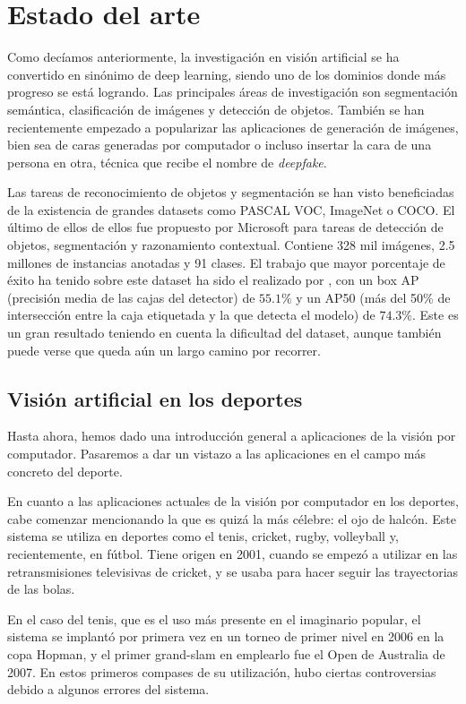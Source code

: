 \section{Estado del arte}

Como decíamos anteriormente, la investigación en visión artificial se ha convertido en sinónimo de deep learning, siendo uno de los dominios donde más progreso se está logrando. Las principales áreas de investigación son segmentación semántica, clasificación de imágenes y detección de objetos. También se han recientemente empezado a popularizar las aplicaciones de generación de imágenes, bien sea de caras generadas por computador o incluso insertar la cara de una persona en otra, técnica que recibe el nombre de \textit{deepfake}.

Las tareas de reconocimiento de objetos y segmentación se han visto beneficiadas de la existencia de grandes datasets como PASCAL VOC, ImageNet o COCO. El último de ellos de ellos fue propuesto por Microsoft para tareas de detección de objetos, segmentación y razonamiento contextual. Contiene 328 mil imágenes, 2.5 millones de instancias anotadas y 91 clases. El trabajo que mayor porcentaje de éxito ha tenido sobre este dataset ha sido el realizado por \citet{art:tan2019efficientdet}, con un box AP (precisión media de las cajas del detector) de $55.1\%$ y un AP50 (más del 50\% de intersección entre la caja etiquetada y la que detecta el modelo) de $74.3\%$. Este es un gran resultado teniendo en cuenta la dificultad del dataset, aunque también puede verse que queda aún un largo camino por recorrer.

\subsection{Visión artificial en los deportes}
Hasta ahora, hemos dado una introducción general a aplicaciones de la visión por computador. Pasaremos a dar un vistazo a las aplicaciones en el campo más concreto del deporte.

En cuanto a las aplicaciones actuales de la visión por computador en los deportes, cabe comenzar mencionando la que es quizá la más célebre: el ojo de halcón. Este sistema se utiliza en deportes como el tenis, cricket, rugby, volleyball y, recientemente, en fútbol. Tiene origen en 2001, cuando se empezó a utilizar en las retransmisiones televisivas de cricket, y se usaba para hacer seguir las trayectorias de las bolas.

En el caso del tenis, que es el uso más presente en el imaginario popular, el sistema se implantó por primera vez en un torneo de primer nivel en 2006 en la copa Hopman, y el primer grand-slam en emplearlo fue el Open de Australia de 2007. En estos primeros compases de su utilización, hubo ciertas controversias debido a algunos errores del sistema.

